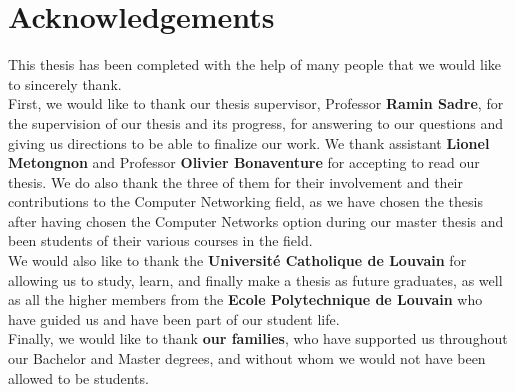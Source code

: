 \section*{Acknowledgements}

This thesis has been completed with the help of many people that we would like to sincerely thank.\\ 

First, we would like to thank our thesis supervisor, Professor \textbf{Ramin Sadre}, for the supervision of our thesis and its progress, for answering to our questions and giving us directions to be able to finalize our work. We thank assistant \textbf{Lionel Metongnon} and Professor \textbf{Olivier Bonaventure} for accepting to read our thesis. We do also thank the three of them for their involvement and their contributions to the Computer Networking field, as we have chosen the thesis after having chosen the Computer Networks option during our master thesis and been students of their various courses in the field. \\

We would also like to thank the \textbf{Université Catholique de Louvain} for allowing us to study, learn, and finally make a thesis as future graduates, as well as all the higher members from the \textbf{Ecole Polytechnique de Louvain} who have guided us and have been part of our student life.\\

Finally, we would like to thank \textbf{our families}, who have supported us throughout our Bachelor and Master degrees, and without whom we would not have been allowed to be students.